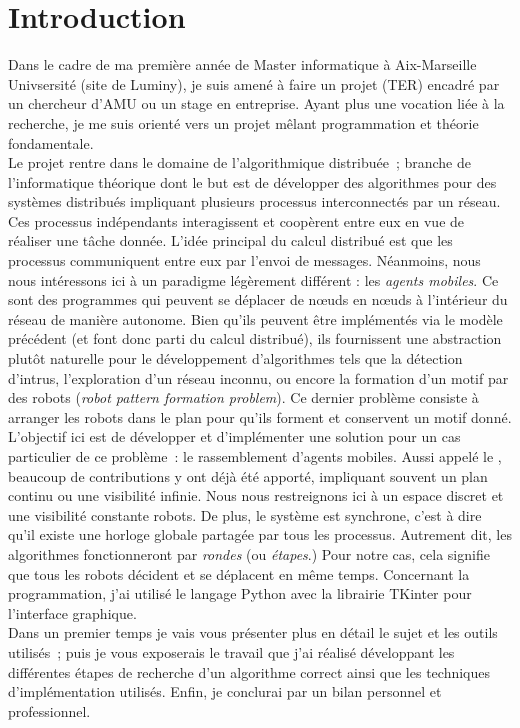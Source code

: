 \section*{Introduction}
Dans le cadre de ma première année de Master informatique à Aix-Marseille
Univsersité (site de Luminy), je suis amené à faire un projet (TER) encadré par
un chercheur d'AMU ou un stage en entreprise. Ayant plus une vocation liée à la
recherche, je me suis orienté vers un projet mêlant programmation et théorie
fondamentale. \\

Le projet rentre dans le domaine de l'algorithmique distribuée~; branche de
l'informatique théorique dont le but est de développer des algorithmes pour des
systèmes distribués impliquant plusieurs processus interconnectés par un
réseau. Ces processus indépendants interagissent et coopèrent entre eux en vue
de réaliser une tâche donnée.  L'idée principal du calcul distribué est que les
processus communiquent entre eux par l'envoi de messages. Néanmoins, nous nous
intéressons ici à un paradigme légèrement différent : les \textit{agents
mobiles}. Ce sont des programmes qui peuvent se déplacer de n\oe{}uds en
n\oe{}uds à l'intérieur du réseau de manière autonome. Bien qu'ils peuvent être
implémentés via le modèle précédent (et font donc parti du calcul distribué),
ils fournissent une abstraction plutôt naturelle pour le développement
d'algorithmes tels que la détection d'intrus, l'exploration d'un réseau
inconnu, ou encore la formation d'un motif par des robots (\textit{robot
pattern formation problem}). Ce dernier problème consiste à arranger les robots
dans le plan pour qu'ils forment et conservent un motif donné. \\

L'objectif ici est de développer et d'implémenter une solution pour un cas
particulier de ce problème~: le rassemblement d'agents mobiles. Aussi appelé le
\GatheringProblem, beaucoup de contributions y ont déjà été apporté, impliquant
souvent un plan continu ou une visibilité infinie. Nous nous restreignons ici à
un espace discret et une visibilité constante robots. De plus, le système est
synchrone, c'est à dire qu'il existe une horloge globale partagée par tous les
processus. Autrement dit, les algorithmes fonctionneront par \textit{rondes}
(ou \textit{étapes}.) Pour notre cas, cela signifie que tous les robots
décident et se déplacent en même temps. Concernant la programmation, j'ai
utilisé le langage Python avec la librairie TKinter pour l'interface graphique.
\\

Dans un premier temps je vais vous présenter plus en détail le sujet et les
outils utilisés~; puis je vous exposerais le travail que j'ai réalisé
développant les différentes étapes de recherche d'un algorithme correct ainsi
que les techniques d'implémentation utilisés. Enfin, je conclurai par un bilan
personnel et professionnel.
